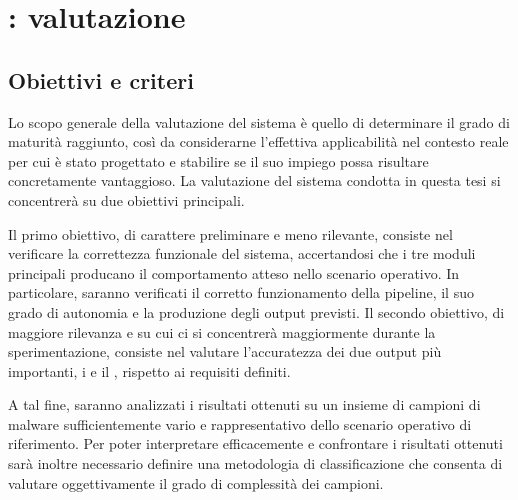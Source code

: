 \chapter{\system{}: valutazione} \label{chap:valutazione} %


\section{Obiettivi e criteri} %

Lo scopo generale della valutazione del sistema è quello di determinare il grado di maturità raggiunto, così da considerarne l'effettiva applicabilità nel contesto reale per cui è stato progettato e stabilire se il suo impiego possa risultare concretamente vantaggioso. La valutazione del sistema \system{} condotta in questa tesi si concentrerà su due obiettivi principali.

Il primo obiettivo, di carattere preliminare e meno rilevante, consiste nel verificare la correttezza funzionale del sistema, accertandosi che i tre moduli principali producano il comportamento atteso nello scenario operativo. In particolare, saranno verificati il corretto funzionamento della pipeline, il suo grado di autonomia e la produzione degli output previsti. Il secondo obiettivo, di maggiore rilevanza e su cui ci si concentrerà maggiormente durante la sperimentazione, consiste nel valutare l'accuratezza dei due output più importanti, i \report{} e il \capture{}, rispetto ai requisiti definiti.


A tal fine, saranno analizzati i risultati ottenuti su un insieme di campioni di malware sufficientemente vario e rappresentativo dello scenario operativo di riferimento. Per poter interpretare efficacemente e confrontare i risultati ottenuti sarà inoltre necessario definire una metodologia di classificazione che consenta di valutare oggettivamente il grado di complessità dei campioni.

